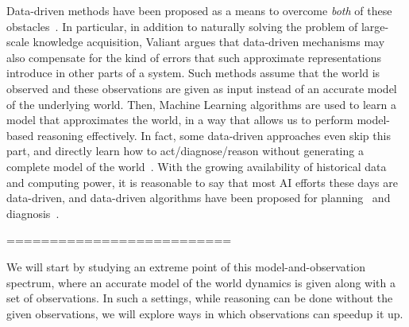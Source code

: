 Data-driven methods have been proposed as a means to overcome {\em both} of these obstacles~\cite{valiant2000neuroidal,valiant2000robustLogics}. In particular, in addition to naturally solving the problem of large-scale knowledge acquisition, Valiant argues that data-driven mechanisms may also compensate for the kind of errors that such approximate representations %
introduce in other parts of a system. Such methods assume that the world is observed and these observations are given as input instead of an accurate model of the underlying world. Then, Machine Learning algorithms are used to learn a model that approximates the world, 
in a way that allows us to perform model-based reasoning effectively. 
In fact, some data-driven approaches even skip this part, and directly learn how to act/diagnose/reason without generating a complete model of the world~\cite{kearns2002POMDPsample}. %
With the growing availability of historical data and computing power, it is reasonable to say that most AI efforts these days are data-driven,
and data-driven algorithms have been proposed for  planning~\cite{fern2011first,juba2016jmlr} and diagnosis~\cite{keren2011model,qin2012survey}.









==========================




We will start by studying an extreme point of this model-and-observation spectrum, where an accurate model of the world dynamics is given along with a set of observations. 
In such a settings, while reasoning can be done without the given observations, we will explore ways in which observations can speedup it up. 

